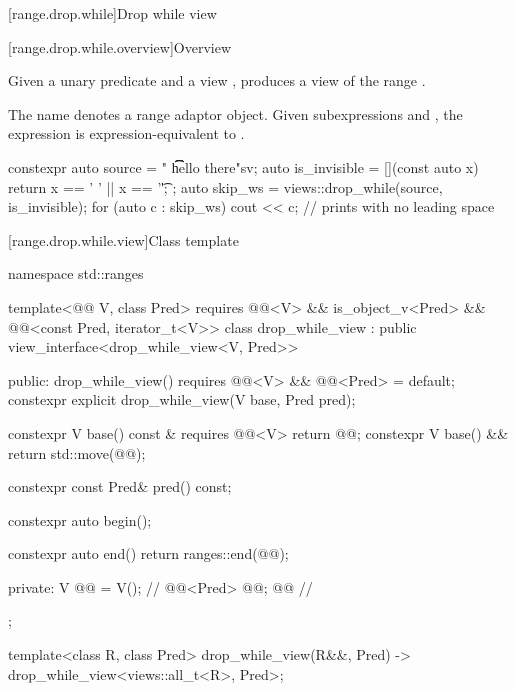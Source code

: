 [range.drop.while]{Drop while view}

[range.drop.while.overview]{Overview}

\pnum
Given a unary predicate  and a view ,
 produces a view
of the range .

\pnum
{}%
The name 
denotes a range adaptor object.
Given subexpressions  and ,
the expression 
is expression-equivalent to .

\pnum
\begin{example}
\begin{codeblock}
constexpr auto source = "  \t   \t   \t   hello there"sv;
auto is_invisible = [](const auto x) { return x == ' ' || x == '\t'; };
auto skip_ws = views::drop_while(source, is_invisible);
for (auto c : skip_ws) {
  cout << c;                                    // prints  with no leading space
}
\end{codeblock}
\end{example}

[range.drop.while.view]{Class template }

%
%
%
\begin{codeblock}
namespace std::ranges {
  template<@@ V, class Pred>
    requires @@<V> && is_object_v<Pred> &&
             @@<const Pred, iterator_t<V>>
  class drop_while_view : public view_interface<drop_while_view<V, Pred>> {
  public:
    drop_while_view() requires @@<V> && @@<Pred> = default;
    constexpr explicit drop_while_view(V base, Pred pred);

    constexpr V base() const & requires @@<V> { return @@; }
    constexpr V base() && { return std::move(@@); }

    constexpr const Pred& pred() const;

    constexpr auto begin();

    constexpr auto end() { return ranges::end(@@); }

  private:
    V @@ = V();                                      // \expos
    @@<Pred> @@; @\itcorr[-1]@                           // \expos
  };

  template<class R, class Pred>
    drop_while_view(R&&, Pred) -> drop_while_view<views::all_t<R>, Pred>;
}
\end{codeblock}

